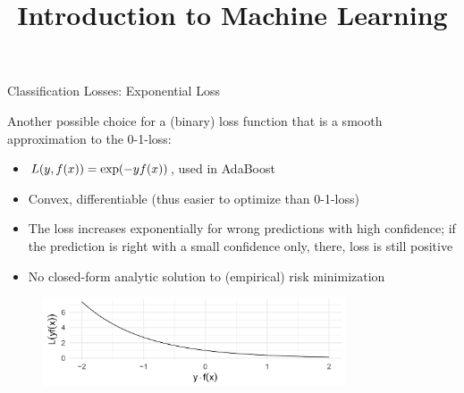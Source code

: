 





\newcommand{\titlefigure}{figure_man/optimization_steps.jpeg}
\newcommand{\learninggoals}{
  \item Know the exponential loss
  \item Know the AUC loss 
}

\title{Introduction to Machine Learning}
\date{}






\begin{vbframe}{Classification Losses: Exponential Loss}

Another possible choice for a (binary) loss function that is a smooth approximation to the 0-1-loss:
\begin{itemize}
\item $L(y, f(x)) = \exp(-yf(x))$, used in AdaBoost
\item Convex, differentiable (thus easier to optimize than 0-1-loss)
\item The loss increases exponentially for wrong predictions with high confidence; if the prediction is right with a small confidence only, there, loss is still positive
\item No closed-form analytic solution to (empirical) risk minimization
\end{itemize}


\begin{figure}
\includegraphics[width = 0.8\textwidth]{figure_man/exponential-loss.png}
\end{figure}

\end{vbframe}

